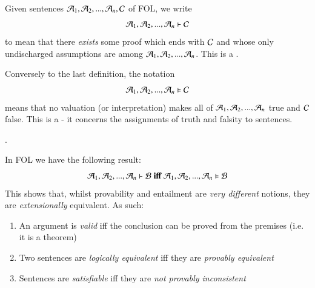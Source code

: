 \documentclass[12pt, a4paper, oneside, openright, titlepage]{book}
\begin{document}
\begin{defn}
    Given sentences $\mathcal{A}_1,\mathcal{A}_2,...,\mathcal{A}_n,\mathcal{C}$ of FOL, we write \begin{equation*}
        \mathcal{A}_1,\mathcal{A}_2,...,\mathcal{A}_n\vdash\mathcal{C}
    \end{equation*}
    to mean that there \emph{exists} some proof which ends with $\mathcal{C}$ and whose only undischarged assumptions are among $\mathcal{A}_1,\mathcal{A}_2,...,\mathcal{A}_n$. This is a .
\end{defn}

\begin{defn}
    Conversely to the last definition, the notation \begin{equation*}
        \mathcal{A}_1,\mathcal{A}_2,...,\mathcal{A}_n\vDash \mathcal{C}
    \end{equation*}
    means that no valuation (or interpretation) makes all of $\mathcal{A}_1,\mathcal{A}_2,...,\mathcal{A}_n$ true and $\mathcal{C}$ false. This is a  - it concerns the assignments of truth and falsity to sentences.
\end{defn}

.

\begin{thm}
    In FOL we have the following result: \begin{equation*}
        \mathcal{A}_1,\mathcal{A}_2,...,\mathcal{A}_n\vdash\mathcal{B}\;\textbf{iff}\;\mathcal{A}_1,\mathcal{A}_2,...,\mathcal{A}_n\vDash\mathcal{B}
    \end{equation*}
    This shows that, whilst provability and entailment are \emph{very different} notions, they are \emph{extensionally} equivalent. As such: \begin{enumerate}
        \item An argument is \emph{valid} iff the conclusion can be proved from the premises (i.e. it is a theorem)
        \item Two sentences are \emph{logically equivalent} iff they are \emph{provably equivalent}
        \item Sentences are \emph{satisfiable} iff they are \emph{not provably inconsistent}
    \end{enumerate}
\end{thm}
\end{document}

